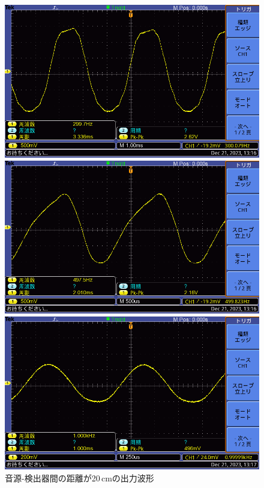 \documentclass{ltjsarticle}
\begin{document}
\begin{figure}[H]
\begin{minipage}{0.4\columnwidth}
			\includegraphics[width = \columnwidth]{figs/F0028TEK.PNG}
			\end{minipage}
			\hspace{0.04\columnwidth}
			\begin{minipage}{0.4\columnwidth}
			\centering
			\includegraphics[width = \columnwidth]{figs/F0029TEK.PNG}
			\end{minipage}
			\hspace{0.04\columnwidth}
			\begin{minipage}{0.4\columnwidth}
			\centering
			\includegraphics[width = \columnwidth]{figs/F0030TEK.PNG}
			\end{minipage}
			\caption{音源-検出器間の距離が20\,cmの出力波形}
			\label{fig:week5-3-20}
			\end{figure}
\end{document}
